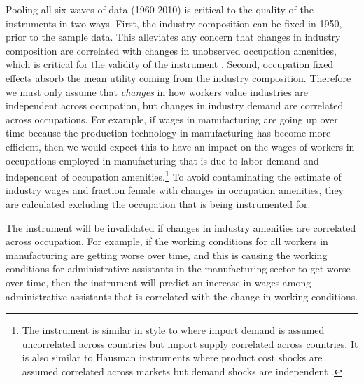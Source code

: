 \documentclass[11pt]{article}
\begin{document}
Pooling all six waves of data (1960-2010) is critical to the quality of the instruments in two ways. First, the industry composition can be fixed in 1950, prior to the sample data. This alleviates any concern that changes in industry composition are correlated with changes in unobserved occupation amenities, which is critical for the validity of the instrument \cite{SorkinBartik}. Second, occupation fixed effects absorb the mean utility coming from the industry composition. Therefore we must only assume that \textit{changes} in how workers value industries are independent across occupation, but changes in industry demand are correlated across occupations. For example, if wages in manufacturing are going up over time because the production technology in manufacturing has become more efficient, then we would expect this to have an impact on the wages of workers in occupations employed in manufacturing that is due to labor demand and independent of occupation amenities.\footnote{The instrument is similar in style to  where import demand is assumed uncorrelated across countries but import supply correlated across countries. It is also similar to Hausman instruments where product cost shocks are assumed correlated across markets but demand shocks are independent \cite{Hausman1996a, Nevo2001}.} To avoid contaminating the estimate of industry wages and fraction female with changes in occupation amenities, they are calculated excluding the occupation that is being instrumented for.


The instrument will be invalidated if changes in industry amenities are correlated across occupation. For example, if the working conditions for all workers in manufacturing are getting worse over time, and this is causing the working conditions for administrative assistants in the manufacturing sector to get worse over time, then the instrument will predict an increase in wages among administrative assistants that is correlated with the change in working conditions.
\end{document}
